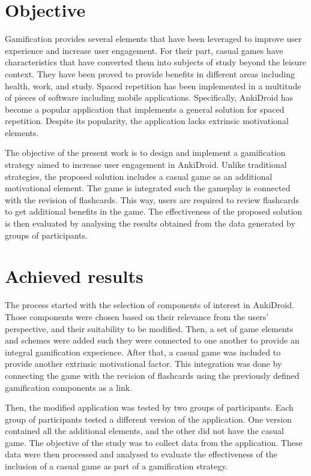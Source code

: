 \section{Objective}
Gamification provides several elements that have been leveraged to improve user experience and increase user engagement. For their part, casual games have characteristics that have converted them into subjects of study beyond the leisure context. They have been proved to provide benefits in different areas including health, work, and study. Spaced repetition has been implemented in a multitude of pieces of software including mobile applications. Specifically, AnkiDroid \citep{raoul2012ankidroid} has become a popular application that implements a general solution for spaced repetition. Despite its popularity, the application lacks extrinsic motivational elements.

The objective of the present work is to design and implement a gamification strategy aimed to increase user engagement in AnkiDroid. Unlike traditional strategies, the proposed solution includes a casual game as an additional motivational element. The game is integrated such the gameplay is connected with the revision of flashcards. This way, users are required to review flashcards to get additional benefits in the game.
The effectiveness of the proposed solution is then evaluated by analysing the results obtained from the data generated by groups of participants.


\section{Achieved results}
The process started with the selection of components of interest in AnkiDroid. Those components were chosen based on their relevance from the users' perspective, and their suitability to be modified. Then, a set of game elements and schemes were added such they were connected to one another to provide an integral gamification experience. After that, a casual game was included to provide another extrinsic motivational factor. This integration was done by connecting the game with the revision of flashcards using the previously defined gamification components as a link.

Then, the modified application was tested by two groups of participants. Each group of participants tested a different version of the application. One version contained all the additional elements, and the other did not have the casual game. The objective of the study was to collect data from the application. These data were then processed and analysed to evaluate the effectiveness of the inclusion of a casual game as part of a gamification strategy.

